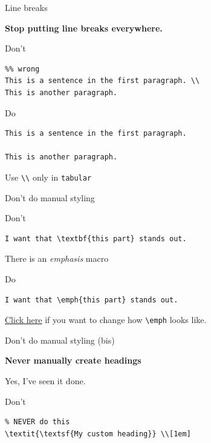 \documentclass[xetex, onlymath, handout]{beamer}
\begin{document}
\begin{frame}[fragile]{Line breaks}

  {\LARGE \bfseries Stop putting line breaks everywhere.}

  \begin{alertblock}{Don't}
    \begin{lstlisting}
%% wrong
This is a sentence in the first paragraph. \\
This is another paragraph.
    \end{lstlisting}
  \end{alertblock}

  \begin{block}{Do}
    \begin{lstlisting}
This is a sentence in the first paragraph.

This is another paragraph.
    \end{lstlisting}
  \end{block}

  Use \lstinline!\\! only in \lstinline!tabular!

\end{frame}

\begin{frame}[fragile]{Don't do manual styling}

  \begin{alertblock}{Don't}
    \begin{lstlisting}
I want that \textbf{this part} stands out.
    \end{lstlisting}
  \end{alertblock}

  There is an \emph{emphasis} macro

  \begin{block}{Do}
    \begin{lstlisting}
I want that \emph{this part} stands out.
    \end{lstlisting}
  \end{block}

  \href{https://github.com/HSR-Stud/Willkommen/blob/master/Guidelines.md#text-and-structure}{Click here} if you want to change how \lstinline!\emph! looks like.

\end{frame}

\begin{frame}[fragile]{Don't do manual styling (bis)}

  {\LARGE \bfseries Never manually create headings}
  
  Yes, I've seen it done.

  \begin{alertblock}{Don't}
    \begin{lstlisting}
% NEVER do this
\textit{\textsf{My custom heading}} \\[1em]
    \end{lstlisting}
  \end{alertblock}

\end{frame}
\end{document}
